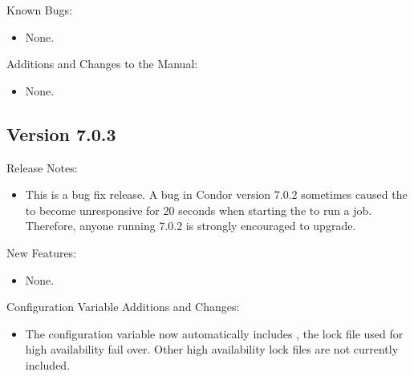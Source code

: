 \noindent Known Bugs:

\begin{itemize}

\item None.

\end{itemize}

\noindent Additions and Changes to the Manual:

\begin{itemize}

\item None.

\end{itemize}

\subsection*{\label{sec:New-7-0-3}Version 7.0.3}

\noindent Release Notes:

\begin{itemize}

\item This is a bug fix release.  A bug in Condor version 7.0.2 sometimes caused
the  to become unresponsive for 20 seconds when starting
the  to run a job.
Therefore, anyone running 7.0.2 is strongly encouraged to upgrade.

\end{itemize}


\noindent New Features:

\begin{itemize}

\item None.

\end{itemize}

\noindent Configuration Variable Additions and Changes:

\begin{itemize}

\item The configuration variable  now automatically 
includes ,
the lock file used for high availability  fail over.  Other
high availability lock files are not currently included.

\end{itemize}

